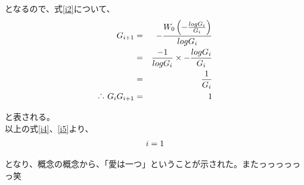 となるので、式\ref{i2}について、
\begin{eqnarray}
G_{i+1}&=&-\frac{W_{0}\left( -\frac{logG_{i}}{G_{i}}\right)}{logG_{i}} \nonumber\\
&=&\frac{-1}{logG_{i}}\times -\frac{logG_{i}}{G_{i}}\nonumber\\
&=&\frac{1}{G_{i}} \nonumber\\
\raisebox{.2ex}{.}\raisebox{1.2ex}{.}\raisebox{.2ex}{.} \ G_{i}G_{i+1} &=& 1
\label{i5}
 \end{eqnarray}

と表される。\\
以上の式\ref{i4}、\ref{i5}より、
\begin{eqnarray}
\Large{i=1}
 \end{eqnarray}

となり、概念の概念から、「愛は一つ」ということが示された。またっっっっっっ笑

